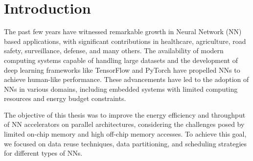 \begin{comment}
\section{Conclusion}
In conclusion, this thesis has made significant strides in the realm of energy-efficient NN inferencing on edge devices. By leveraging data reuse techniques, quantization approaches, and an analytical framework for estimating off-chip memory accesses, we have demonstrated that it is possible to achieve remarkable energy efficiency improvements without sacrificing accuracy. The proposed solutions contribute to the advancement of NN accelerators for a wide range of applications, from healthcare and agriculture to autonomous driving and recommender systems.

The findings presented in this work offer valuable insights into optimizing neural network performance on parallel architectures, with implications for the broader domain of artificial intelligence. As the field of NN applications continues to grow and evolve, the research conducted here paves the way for more energy-efficient, high-performance NN inferencing on edge devices.

We hope that the outcomes of this research will inspire further exploration and innovation, ultimately leading to the development of smarter and more energy-conscious artificial intelligence systems that positively impact various aspects of human life.
\end{comment}
\section{Introduction}
The past few years have witnessed remarkable growth in Neural Network (NN) based applications, with significant contributions in healthcare, agriculture, road safety, surveillance, defense, and many others. The availability of modern computing systems capable of handling large datasets and the development of deep learning frameworks like TensorFlow and PyTorch have propelled NNs to achieve human-like performance. These advancements have led to the adoption of NNs in various domains, including embedded systems with limited computing resources and energy budget constraints.

The objective of this thesis was to improve the energy efficiency and throughput of NN accelerators on parallel architectures, considering the challenges posed by limited on-chip memory and high off-chip memory accesses. To achieve this goal, we focused on data reuse techniques, data partitioning, and scheduling strategies for different types of NNs.

